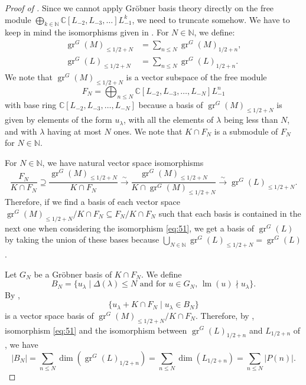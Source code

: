 \documentclass[a4paper, 12pt, reqno]{amsart}
\theoremstyle{remark}
\DeclareMathOperator{\gr}{gr}
\DeclareMathOperator{\lm}{lm}
\begin{document}
\begin{proof}[Proof of ]
  Since we cannot apply Gröbner basis theory directly on the free module $\bigoplus_{k \in \mathbb{N}}\mathbb{C}[L_{-2}, L_{-3}, \dots]L_{-1}^k$, we need to truncate somehow.
  We have to keep in mind the isomorphisms given in .
  For $N \in \mathbb{N}$, we define:
  \begin{align*}
    \gr^G(M)_{\le 1/2 + N} &= \sum_{n \le N}\gr^G(M)_{1/2 + n}, \\
    \gr^G(L)_{\le 1/2 + N} &= \sum_{n \le N}\gr^G(L)_{1/2 + n}.
  \end{align*}
  We note that $\gr^G(M)_{\le 1/2 + N}$ is a vector subspace of the free module
  \begin{equation*}
    F_N = \bigoplus_{n \le N}\mathbb{C}[L_{-2}, L_{-3}, \dots, L_{-N}]L_{-1}^n
  \end{equation*}
  with base ring $\mathbb{C}[L_{-2}, L_{-3}, \dots, L_{-N}]$ because a basis of $\gr^G(M)_{\le 1/2 + N}$ is given by elements of the form $u_{\lambda}$, with all the elements of $\lambda$ being less than $N$, and with $\lambda$ having at most $N$ ones.
  We note that $K \cap F_N$ is a submodule of $F_N$ for $N \in \mathbb{N}$.

  For $N \in \mathbb{N}$, we have natural vector space isomorphisms
  \begin{equation}
    \label{eq:51}
    \frac{F_N}{K \cap F_N} \supseteq \frac{\gr^G(M)_{\le 1/2 + N}}{K \cap F_N} \xrightarrow{\sim} \frac{\gr^G(M)_{\le 1/2 + N}}{K \cap \gr^G(M)_{\le 1/2 + N}} \xrightarrow{\sim} \gr^G(L)_{\le 1/2 + N}.
  \end{equation}
  Therefore, if we find a basis of each vector space $\gr^G(M)_{\le 1/2 + N}/K \cap F_N \subseteq F_N/K \cap F_N$ such that each basis is contained in the next one when considering the isomorphism \eqref{eq:51}, we get a basis of $\gr^G(L)$ by taking the union of these bases because $\bigcup_{N \in \mathbb{N}}\gr^G(L)_{\le 1/2 + N} = \gr^G(L)$.

  Let $G_N$ be a Gröbner basis of $K \cap F_N$.
  We define
  \begin{equation*}
    B_N = \{u_{\lambda} \mid \text{$\Delta(\lambda) \le N$ and for $u \in G_N$, $\lm(u) \nmid u_{\lambda}$}\}.
  \end{equation*}
  By \cite[Proposition 3.6.4]{adams_introduction_1994},
  \begin{equation}
    \label{eq:52}
    \{u_{\lambda} + K \cap F_N \mid u_{\lambda} \in B_N\}
  \end{equation}
  is a vector space basis of $\gr^G(M)_{\le 1/2 + N}/K \cap F_N$.
  Therefore, by , isomorphism \eqref{eq:51} and the isomorphism between $\gr^G(L)_{1/2 + n}$ and $L_{1/2 + n}$ of , we have
  \begin{equation*}
    |B_N| = \sum_{n \le N}\dim(\gr^G(L)_{1/2 + n}) = \sum_{n \le N}\dim(L_{1/2 + n}) = \sum_{n \le N}|P(n)|.
  \end{equation*}


\end{proof}
\end{document}
